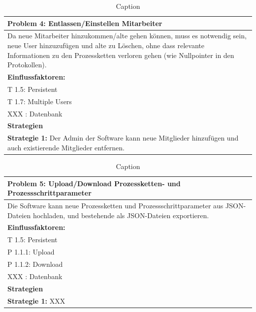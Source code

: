 \documentclass[enabledeprecatedfontcommands,fontsize=12pt,paper=a4,twoside]{scrartcl}
\begin{document}
\begin{table}[]
    \centering
    \begin{tabular}{|p{15cm}|}
    \hline
          \textbf{Problem 4:} Entlassen/Einstellen Mitarbeiter \\ \hline
          Da neue Mitarbeiter hinzukommen/alte gehen können, muss es notwendig sein, neue User hinzuzufügen und alte zu Löschen, ohne dass relevante Informationen zu den Prozessketten verloren gehen (wie Nullpointer in den Protokollen).
          \\ \hline
          \textbf{Einflussfaktoren: } \\
          T 1.5: Persistent \\
          T 1.7: Multiple Users\\

          XXX : Datenbank \\
          \hline
          \textbf{Strategien} \\ \hline
          \textbf{Strategie 1:} Der Admin der Software kann neue Mitglieder hinzufügen und auch existierende Mitglieder entfernen.
          \\ \hline
    \end{tabular}

    \caption{Caption}
    \label{tab:my_label}
\end{table}

\begin{table}[]
    \centering
    \begin{tabular}{|p{15cm}|}
    \hline
          \textbf{Problem 5:} Upload/Download Prozessketten- und Prozessschrittparameter \\ \hline
          Die Software kann neue Prozessketten und Prozessschrittparameter aus JSON-Dateien hochladen, und bestehende als JSON-Dateien exportieren.
          \\ \hline
          \textbf{Einflussfaktoren: } \\
          T 1.5: Persistent \\
          P 1.1.1: Upload\\
          P 1.1.2: Download\\
          XXX : Datenbank \\
          \hline
          \textbf{Strategien} \\ \hline
          \textbf{Strategie 1:} XXX
          \\ \hline
    \end{tabular}

    \caption{Caption}
    \label{tab:my_label}
\end{table}
\end{document}
